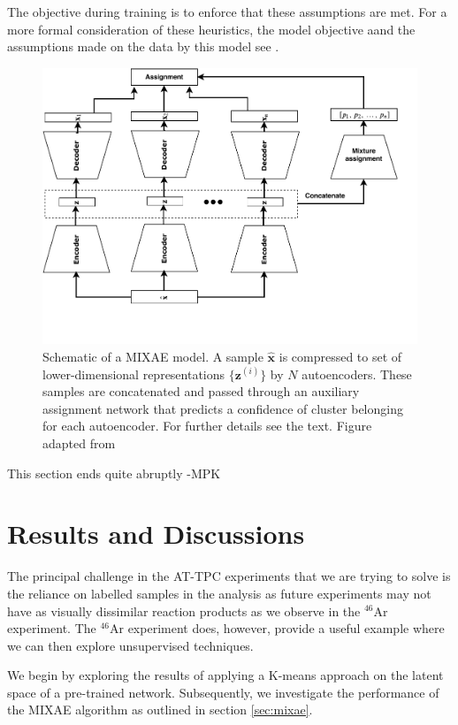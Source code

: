 \documentclass[review,number,sort&compress]{elsarticle}
\begin{document}
\noindent The objective during training is to enforce that these assumptions are met. For a more formal consideration of these heuristics, the model objective aand the assumptions made on the data by this model see \citet{Zhang}.

\begin{figure}[tb]
	\centering
	\includegraphics[width=.8\textwidth]{plots/mixae.pdf}
	\caption[Mixture of autoencoders schematic]{Schematic of a MIXAE model. A sample $\hat{\boldsymbol{x}}$ is compressed to set of lower-dimensional representations $\{\boldsymbol{z}^{(i)}\}$ by $N$ autoencoders. These samples are concatenated and passed through an auxiliary assignment network that predicts a confidence of cluster belonging for each autoencoder. For further details see the text. Figure adapted from \citet{Zhang}}
	\label{fig:mixae}
\end{figure}
{\color{blue} This section ends quite abruptly -MPK}


\section{Results and Discussions}\label{sec:results}

The principal challenge in the AT-TPC experiments that we are trying to solve is the reliance on labelled samples in the analysis as future experiments may not have as visually dissimilar reaction products  as we observe in the ${}^{46}$Ar experiment.  The  ${}^{46}$Ar experiment does, however, provide a useful example where we can then explore unsupervised techniques. 

We begin by exploring the results of applying a K-means approach on the latent space of a pre-trained network. Subsequently, we investigate the performance of the MIXAE algorithm as outlined in section \ref{sec:mixae}.
\end{document}
